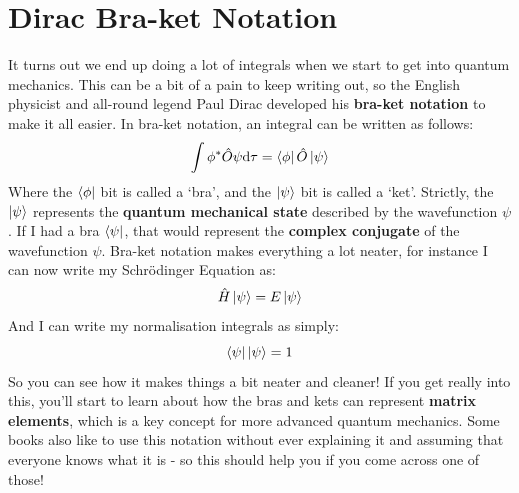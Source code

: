 \documentclass{memoir}[11pt,oneside,a4paper,openany]
\begin{document}
\section{Dirac Bra-ket Notation}
It turns out we end up doing a lot of integrals when we start to get into quantum mechanics. This can be a bit of a pain to keep writing out, so the English physicist and all-round legend Paul Dirac developed his \textbf{bra-ket notation} to make it all easier. In bra-ket notation, an integral can be written as follows:
\begin{equation}
	\int \phi^* \hat{O} \psi \mathrm{d}\tau = \bra{\phi}\hat{O}\ket{\psi}
\end{equation}
Where the $\bra{\phi}$ bit is called a `bra', and the $\ket{\psi}$ bit is called a `ket'. Strictly, the $\ket{\psi}$ represents the \textbf{quantum mechanical state} described by the wavefunction $\psi$. If I had a bra $\bra{\psi}$, that would represent the \textbf{complex conjugate} of the wavefunction $\psi$. Bra-ket notation makes everything a lot neater, for instance I can now write my Schr{\"o}dinger Equation as:
\begin{equation}
	\hat{H}\ket{\psi} = E\ket{\psi}
\end{equation}
And I can write my normalisation integrals as simply:
\begin{equation}
	\bra{\psi}\ket{\psi} = 1
\end{equation}
So you can see how it makes things a bit neater and cleaner! If you get really into this, you'll start to learn about how the bras and kets can represent \textbf{matrix elements}, which is a key concept for more advanced quantum mechanics. Some books also like to use this notation without ever explaining it and assuming that everyone knows what it is - so this should help you if you come across one of those!
\end{document}
